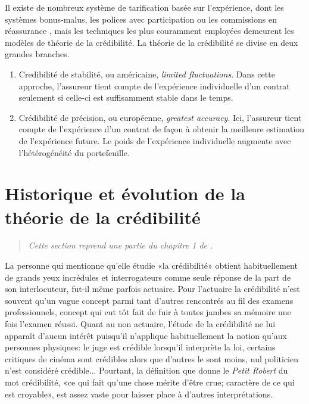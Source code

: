 Il existe de nombreux système de tarification basée sur l'expérience,
dont les systèmes bonus-malus, les polices avec participation ou les
commissions en réassurance \citep{Neuhaus:experiencerating:EAS:2004,%
  Buhlmann:credibility:1967,Buhlmann:credibility:1969}, mais les
techniques les plus couramment employées demeurent les modèles de
théorie de la crédibilité. La théorie de la crédibilité se divise en
deux grandes branches.
\begin{enumerate}
\item Credibilité de stabilité, ou américaine, \emph{limited
    fluctuations}. Dans cette approche, l'assureur tient compte de
  l'expérience individuelle d'un contrat seulement si celle-ci est
  suffisamment stable dans le temps.
\item Crédibilité de précision, ou européenne, \emph{greatest
    accuracy}. Ici, l'assureur tient compte de l'expérience d'un
  contrat de façon à obtenir la meilleure estimation de l'expérience
  future. Le poids de l'expérience individuelle augmente avec
  l'hétérogénéité du portefeuille.
\end{enumerate}



\section{Historique et évolution de la théorie de la crédibilité}
\label{sec:introduction-historique:historique}

\begin{quote}
  \itshape Cette section reprend une partie du chapitre 1 de
  \citet{Goulet:masters}.
\end{quote}

La personne qui mentionne qu'elle étudie «la crédibilité» obtient
habituellement de grands yeux incrédules et interrogateurs comme seule
réponse de la part de son interlocuteur, fut-il même parfois actuaire.
Pour l'actuaire la crédibilité n'est souvent qu'un vague concept parmi
tant d'autres rencontrés au fil des examens professionnels, concept
qui eut tôt fait de fuir à toutes jambes sa mémoire une fois l'examen
réussi. Quant au non actuaire, l'étude de la crédibilité ne lui
apparaît d'aucun intérêt puisqu'il n'applique habituellement la notion
qu'aux personnes physiques: le juge est crédible lorsqu'il interprète
la loi, certains critiques de cinéma sont crédibles alors que d'autres
le sont moins, nul politicien n'est considéré crédible... Pourtant, la
définition que donne le \emph{Petit Robert} du mot crédibilité, «ce
qui fait qu'une chose mérite d'être crue; caractère de ce qui est
croyable», est assez vaste pour laisser place à d'autres
interprétations.

